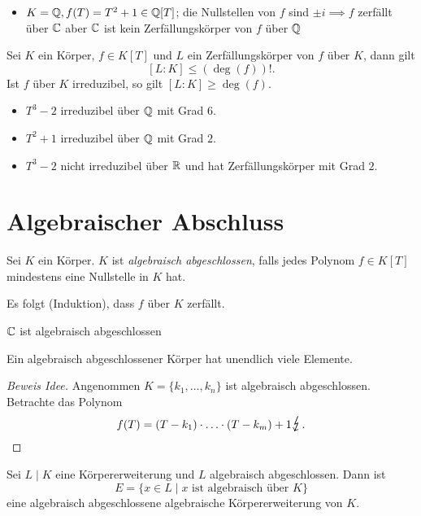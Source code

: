 \begin{eg}
	\begin{itemize}
		\item $K = \mathbb{Q}, f(T) = T^2 +1 \in \mathbb{Q}[T]$; die Nullstellen von $f$ sind $\pm i \implies f$
			zerfällt über $\mathbb{C}$ aber $\mathbb{C}$ ist kein Zerfällungskörper von $f$ über $\mathbb{Q}$
	\end{itemize}
\end{eg}

\begin{remark}
	Sei $K$ ein Körper, $f \in K[T]$ und $L$ ein Zerfällungskörper von $f$ über $K$, dann gilt
	\[
		[L:K] \leq (\deg(f))!
	.\]
	Ist $f$ über $K$ irreduzibel, so gilt $[L:K] \geq \deg(f)$.
	\begin{itemize}
		\item $T^3-2$ irreduzibel über $\mathbb{Q}$ mit Grad $6$.
		\item $T^2+1$ irreduzibel über $\mathbb{Q}$ mit Grad $2$.
		\item $T^3-2$ nicht irreduzibel über $\mathbb{R}$ und hat Zerfällungskörper mit Grad $2$.
	\end{itemize}
\end{remark}

\section{Algebraischer Abschluss}
\begin{definition}
	Sei $K$ ein Körper. $K$ ist \emph{algebraisch abgeschlossen}, falls jedes Polynom $f \in K[T]$ 
	mindestens eine Nullstelle in $K$ hat.
\end{definition}

Es folgt (Induktion), dass $f$ über $K$ zerfällt.
\begin{eg}
	$\mathbb{C}$ ist algebraisch abgeschlossen
\end{eg}

\begin{remark}
	Ein algebraisch abgeschlossener Körper hat unendlich viele Elemente.
	\begin{proof}[Beweis Idee]
		Angenommen $K = \{k_1,\ldots,k_{n}\}$ ist algebraisch abgeschlossen. Betrachte das Polynom
		\[
			f(T) = (T-k_1) \cdot \ldots \cdot (T-k_{m}) + 1 \contra
		.\] 
	\end{proof}
\end{remark}

\begin{proposition}
	Sei $L \mid K$ eine Körpererweiterung und $L$ algebraisch abgeschlossen.
	Dann ist 
	\[
		E = \{x \in L \mid x \text{ ist algebraisch über } K\}
	\]
	eine algebraisch abgeschlossene algebraische Körpererweiterung von $K$.
\end{proposition}

